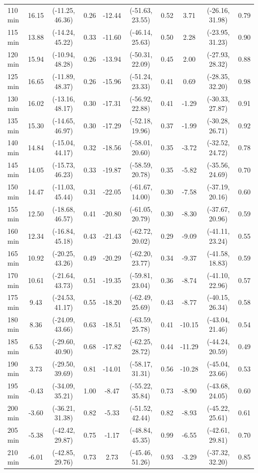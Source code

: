 \begin{table}[ht]
{\begin{tabular}{lccccccccc}
110 min & 16.15 & (-11.25, 46.36) & 0.26 & -12.44 & (-51.63, 23.55) & 0.52 & 3.71 & (-26.16, 31.98) & 0.79 \\
115 min & 13.88 & (-14.24, 45.22) & 0.33 & -11.60 & (-46.14, 25.63) & 0.50 & 2.28 & (-23.95, 31.23) & 0.90 \\
120 min & 15.94 & (-10.94, 48.28) & 0.26 & -13.94 & (-50.31, 22.09) & 0.45 & 2.00 & (-27.93, 28.32) & 0.88 \\
125 min & 16.65 & (-11.89, 48.37) & 0.26 & -15.96 & (-51.24, 23.33) & 0.41 & 0.69 & (-28.35, 32.20) & 0.98 \\
130 min & 16.02 & (-13.16, 48.17) & 0.30 & -17.31 & (-56.92, 22.88) & 0.41 & -1.29 & (-30.33, 27.87) & 0.91 \\
135 min & 15.30 & (-14.65, 46.97) & 0.30 & -17.29 & (-52.18, 19.96) & 0.37 & -1.99 & (-30.28, 26.71) & 0.92 \\
140 min & 14.84 & (-15.04, 44.17) & 0.32 & -18.56 & (-58.01, 20.60) & 0.35 & -3.72 & (-32.52, 24.72) & 0.78 \\
145 min & 14.05 & (-15.73, 46.23) & 0.33 & -19.87 & (-58.59, 20.78) & 0.35 & -5.82 & (-35.56, 24.69) & 0.70 \\
150 min & 14.47 & (-11.03, 45.44) & 0.31 & -22.05 & (-61.67, 14.00) & 0.30 & -7.58 & (-37.19, 20.16) & 0.60 \\
155 min & 12.50 & (-18.68, 46.57) & 0.41 & -20.80 & (-61.05, 20.79) & 0.30 & -8.30 & (-37.67, 20.96) & 0.59 \\
160 min & 12.34 & (-16.84, 45.18) & 0.43 & -21.43 & (-62.72, 20.02) & 0.29 & -9.09 & (-41.11, 23.24) & 0.55 \\
165 min & 10.92 & (-20.25, 43.26) & 0.49 & -20.29 & (-62.20, 23.77) & 0.34 & -9.37 & (-41.58, 18.83) & 0.59 \\
170 min & 10.61 & (-21.64, 43.73) & 0.51 & -19.35 & (-59.81, 23.04) & 0.36 & -8.74 & (-41.10, 22.96) & 0.57 \\
175 min & 9.43 & (-24.53, 41.17) & 0.55 & -18.20 & (-62.49, 25.69) & 0.43 & -8.77 & (-40.15, 26.34) & 0.58 \\
180 min & 8.36 & (-24.09, 43.66) & 0.63 & -18.51 & (-63.59, 25.78) & 0.41 & -10.15 & (-43.04, 21.46) & 0.54 \\
185 min & 6.53 & (-29.60, 40.90) & 0.68 & -17.82 & (-62.25, 28.72) & 0.44 & -11.29 & (-44.24, 20.59) & 0.49 \\
190 min & 3.73 & (-29.50, 39.69) & 0.81 & -14.01 & (-58.17, 31.31) & 0.56 & -10.28 & (-45.04, 23.66) & 0.53 \\
195 min & -0.43 & (-34.09, 35.21) & 1.00 & -8.47 & (-55.22, 35.84) & 0.73 & -8.90 & (-43.68, 24.05) & 0.60 \\
200 min & -3.60 & (-36.21, 31.38) & 0.82 & -5.33 & (-51.52, 42.44) & 0.82 & -8.93 & (-45.22, 25.61) & 0.61 \\
205 min & -5.38 & (-42.42, 29.87) & 0.75 & -1.17 & (-48.84, 45.35) & 0.99 & -6.55 & (-42.61, 29.81) & 0.70 \\
210 min & -6.01 & (-42.85, 29.76) & 0.73 & 2.73 & (-45.46, 51.26) & 0.93 & -3.29 & (-37.32, 32.20) & 0.85 \\
\bottomrule
\end{tabular}%
}
\end{table}
